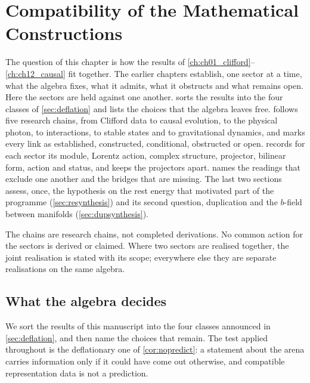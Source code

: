 \chapter{Compatibility of the Mathematical Constructions}
\label{ch:ch13_compatibility}

The question of this chapter is how the results of \cref{ch:ch01_clifford}--\cref{ch:ch12_causal} fit together. The earlier chapters
establish, one sector at a time, what the algebra fixes, what it admits, what it obstructs and what remains open. Here the sectors are held
against one another.  sorts the results into the four classes of \cref{sec:deflation} and lists the choices that the algebra
leaves free.  follows five research chains, from Clifford data to causal evolution, to the physical photon, to interactions,
to stable states and to gravitational dynamics, and marks every link as established, constructed, conditional, obstructed or open.
 records for each sector its module, Lorentz action, complex structure, projector, bilinear form, action and status, and
keeps the projectors apart.  names the readings that exclude one another and the bridges that are missing. The last two
sections assess, once, the hypothesis on the rest energy that motivated part of the programme (\cref{sec:resynthesis}) and its second question,
duplication and the $b$-field between manifolds (\cref{sec:dupsynthesis}).

The chains are research chains, not completed derivations. No common action for the sectors is derived or claimed. Where two sectors are
realised together, the joint realisation is stated with its scope; everywhere else they are separate realisations on the same algebra.



\section{What the algebra decides}
\label{sec:assessment}

We sort the results of this manuscript into the four classes announced in \cref{sec:deflation}, and then name the choices that remain. The test applied throughout is the
deflationary one of \cref{cor:nopredict}: a statement about the arena carries information only if it could have come out otherwise, and compatible representation
data is not a prediction.

